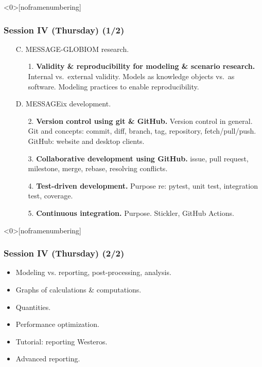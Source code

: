\documentclass[12pt,aspectratio=169]{beamer}
\begin{document}
\begin{frame}<0>[noframenumbering] %
  \frametitle{
    Session IV (Thursday) (1/2)  %
  }

  \begin{enumerate}
    \item [C.] MESSAGE-GLOBIOM research.
          \begin{enumerate}
            \item [1.] \textbf{Validity \& reproducibility for modeling \& scenario research.} Internal vs.\ external validity. Models as knowledge objects vs.\ as software. Modeling practices to enable reproducibility.
          \end{enumerate}

    \item [D.] MESSAGEix development.
          \begin{enumerate}
            \item [2.] \textbf{Version control using git \& GitHub.} Version control in general. Git and concepts: commit, diff, branch, tag, repository, fetch/pull/push. GitHub: website and desktop clients.
            \item [3.] \textbf{Collaborative development using GitHub.} issue, pull request, milestone, merge, rebase, resolving conflicts.
            \item [4.] \textbf{Test-driven development.} Purpose re: pytest, unit test, integration test, coverage.
            \item [5.] \textbf{Continuous integration.} Purpose. Stickler, GitHub Actions.
          \end{enumerate}

  \end{enumerate}

\end{frame}

\begin{frame}<0>[noframenumbering] %
  \frametitle{
    Session IV (Thursday) (2/2) %
  }


  \begin{itemize}
    \item Modeling vs. reporting, post-processing, analysis.
    \item Graphs of calculations \& computations.
    \item Quantities.
    \item Performance optimization.
    \item Tutorial: reporting Westeros.
    \item Advanced reporting.
  \end{itemize}

\end{frame}
\end{document}
